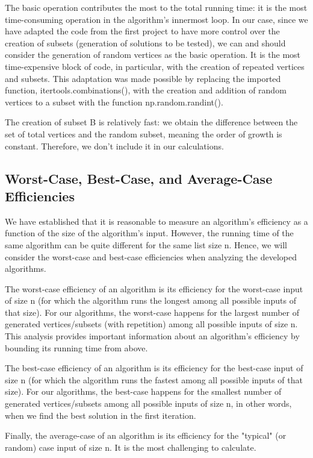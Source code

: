 \documentclass[]{revdetua}
\begin{document}
The basic operation contributes the most to the total running time: it is the most time-consuming operation in the algorithm's innermost loop. In our case, since we have adapted the code from the first project to have more control over the creation of subsets (generation of solutions to be tested), we can and should consider the generation of random vertices as the basic operation. It is the most time-expensive block of code, in particular, with the creation of repeated vertices and subsets. This adaptation was made possible by replacing the imported function, itertools.combinations(), with the creation and addition of random vertices to a subset with the function np.random.randint().

The creation of subset B is relatively fast: we obtain the difference between the set of total vertices and the random subset, meaning the order of growth is constant. Therefore, we don't include it in our calculations. 

\subsection{Worst-Case, Best-Case, and Average-Case Efficiencies}

We have established that it is reasonable to measure an algorithm’s efficiency as a function of the size of the algorithm’s input. However, the running time of the same algorithm can be quite different for the same list size n. Hence, we will consider the worst-case and best-case efficiencies when analyzing the developed algorithms.

The worst-case efficiency of an algorithm is its efficiency for the worst-case input of size n (for which the algorithm runs the longest among all possible inputs of that size). For our algorithms, the worst-case happens for the largest number of generated vertices/subsets (with repetition) among all possible inputs of size n. This analysis provides important information about an algorithm’s efficiency by bounding its running time from above. 

The best-case efficiency of an algorithm is its efficiency for the best-case input of size n (for which the algorithm runs the fastest among all possible inputs of that size). For our algorithms, the best-case happens for the smallest number of generated vertices/subsets among all possible inputs of size n, in other words, when we find the best solution in the first iteration.

Finally, the average-case of an algorithm is its efficiency for the "typical" (or random) case input of size n. It is the most challenging to calculate.
\end{document}
